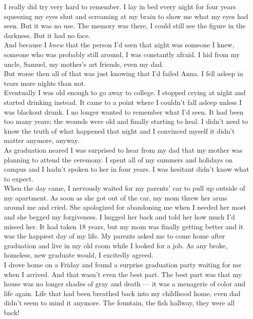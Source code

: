 \documentclass[a5paper]{scrartcl}
\begin{document}
I really did try very hard to remember. I lay in bed every night for four years squeezing my eyes shut and screaming at my brain to show me what my eyes had seen. But it was no use. The memory was there, I could still see the figure in the darkness. But it had no face.\\


And because I \textit{knew}
 that the person I'd seen that night was someone I knew, someone who was probably still around, I was constantly afraid. I hid from my uncle, Samuel, my mother's art friends, even my dad. \\


But worse then all of that was just knowing that I'd failed Anna. I fell asleep in tears more nights than not.\\


Eventually I was old enough to go away to college. I stopped crying at night and started drinking instead. It came to a point where I couldn't fall asleep unless I was blackout drunk.  I no longer wanted to remember what I'd seen. It had been too many years; the wounds were old and finally starting to heal. I didn't need to know the truth of what happened that night and I convinced myself it didn't matter anymore, anyway. \\


As graduation neared I was surprised to hear from my dad that my mother was planning to attend the ceremony.  I spent all of my summers and holidays on campus and I hadn't spoken to her in four years. I was hesitant didn't know what to expect.\\


When the day came, I nervously waited for my parents' car to pull up outside of my apartment. As soon as she got out of the car, my mom threw her arms around me and cried. She apologized for abandoning me when I needed her most and she begged my forgiveness. I hugged her back and told her how much I'd missed her. It had taken 18 years, but my mom was finally getting better and it was the happiest day of my life. My parents asked me to come home after graduation and live in my old room while I looked for a job. As any broke, homeless, new graduate would, I excitedly agreed.\\


I drove home on a Friday and found a surprise graduation party waiting for me when I arrived. And that wasn't even the best part. The best part was that my house was no longer shades of gray and death --- it was a menagerie of color and life again. Life that had been breathed back into my childhood home, even dad didn't seem to mind it anymore. The fountain, the fish hallway, they were all back! \\
\end{document}
